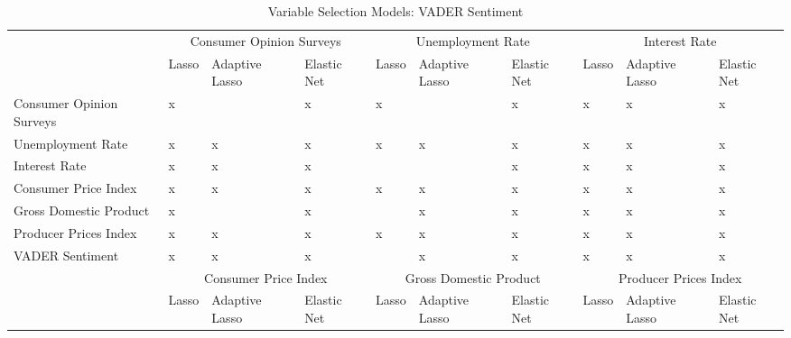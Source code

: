 \begin{landscape}


\begin{table}[]
\caption{Variable Selection Models: VADER Sentiment}
\label{tab:selectionvader}
\begin{adjustbox}{max width=\linewidth}
\begin{tabular}{llllllllll}
\hline
                         & \multicolumn{3}{c}{Consumer Opinion   Surveys} & \multicolumn{3}{c}{Unemployment Rate}      & \multicolumn{3}{c}{Interest Rate}         \\
                         & Lasso     & Adaptive Lasso    & Elastic Net    & Lasso    & Adaptive Lasso   & Elastic Net  & Lasso   & Adaptive Lasso   & Elastic Net  \\
Consumer Opinion Surveys & x         &                   & x              & x        &                  & x            & x       & x                & x            \\
Unemployment Rate        & x         & x                 & x              & x        & x                & x            & x       & x                & x            \\
Interest Rate            & x         & x                 & x              &          &                  & x            & x       & x                & x            \\
Consumer Price Index     & x         & x                 & x              & x        & x                & x            & x       & x                & x            \\
Gross Domestic Product   & x         &                   & x              &          & x                & x            & x       & x                & x            \\
Producer Prices Index    & x         & x                 & x              & x        & x                & x            & x       & x                & x            \\ \hline
VADER Sentiment          & x         & x                 & x              &          & x                & x            & x       & x                & x            \\ \hline
                         & \multicolumn{3}{c}{Consumer Price Index}       & \multicolumn{3}{c}{Gross Domestic Product} & \multicolumn{3}{c}{Producer Prices Index} \\
                         & Lasso     & Adaptive Lasso    & Elastic Net    & Lasso    & Adaptive Lasso   & Elastic Net  & Lasso   & Adaptive Lasso   & Elastic Net  \\

\end{tabular}
\end{adjustbox}
\end{table}
\end{landscape}

